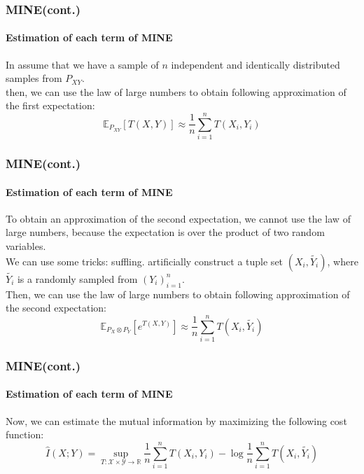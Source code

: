 \documentclass[aspectratio=169]{beamer}
\begin{document}
\begin{frame}
	\frametitle{MINE(cont.)}
	\framesubtitle{Estimation of each term of MINE}
	In assume that we have a sample of $n$ independent and identically distributed samples from $P_{XY}$. \\
	then, we can use the law of large numbers to obtain following approximation of the first expectation:
	\begin{equation} \label{eq:mine_first_term}
		\mathbb{E}_{P_{XY}}[T(X,Y)] \approx \frac{1}{n} \sum_{i=1}^n T(X_i, Y_i)
	\end{equation}	
\end{frame}

\begin{frame}
	\frametitle{MINE(cont.)}
	\framesubtitle{Estimation of each term of MINE}
	To obtain an approximation of the second expectation, we cannot use the law of large numbers,
	because the expectation is over the product of two random variables.\\
	We can use some tricks: suffling. artificially construct a tuple set $(X_i, \tilde{Y_i})$,
	where $\tilde{Y_i}$ is a randomly sampled from $(Y_i)^n_{i=1}$.\\
	Then, we can use the law of large numbers to obtain following approximation of the second expectation:
	\begin{equation}\label{eq:mine_second_term}
		\mathbb{E}_{P_X \otimes P_Y}[e^{T(X,Y)}] \approx \frac{1}{n} \sum_{i=1}^n T(X_i, \tilde{Y_i})
	\end{equation}	
\end{frame}

\begin{frame}
	\frametitle{MINE(cont.)}
	\framesubtitle{Estimation of each term of MINE}
	Now, we can estimate the mutual information by maximizing the following cost function:
	\begin{equation}\label{eq:mine_cost}
		\hat{I}(X;Y) = \sup_{T: \mathcal{X} \times \mathcal{Y} \rightarrow \mathbb{R}}
			{\frac{1}{n} \sum_{i=1}^n T(X_i, Y_i) - \log \frac{1}{n} \sum_{i=1}^n T(X_i, \tilde{Y_i})}
	\end{equation}
\end{frame}
\end{document}
